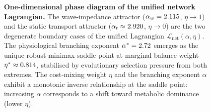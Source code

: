 \begin{figure}[H]
\centering

\caption{\textbf{One-dimensional phase diagram of the unified network Lagrangian.}
The wave-impedance attractor ($\alpha_w = 2.115$,
$\eta\to 1$) and the static transport attractor ($\alpha_t \approx
2.920$, $\eta\to 0$) are the two degenerate boundary cases of the
unified Lagrangian $\mathcal{L}_{\mathrm{net}}(\alpha,\eta)$. The physiological
branching exponent $\alpha^*=2.72$ emerges as the unique robust minimax
saddle point at marginal-balance weight $\eta^*\approx0.814$, stabilised by
evolutionary selection pressure from both extremes. The cost-mixing weight $\eta$ and
the branching exponent $\alpha$ exhibit a monotonic inverse relationship at the
saddle point: increasing $\alpha$ corresponds to a shift toward metabolic
dominance (lower $\eta$).}
\label{fig:phase_diagram}
\end{figure}
